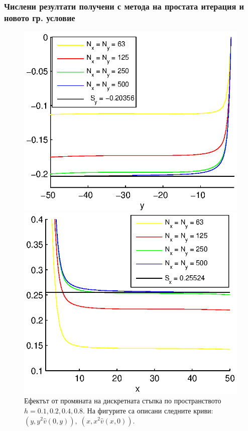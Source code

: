 \documentclass{beamer}
\begin{document}
\begin{frame}
\frametitle{Числени резултати получени с метода на простата итерация и новото гр. условие}
\begin{figure}[ht]
	\begin{minipage}[b]{0.45\linewidth}
		\raggedleft
		\includegraphics[width=\linewidth]{../Thesis/NewBoundaryCondition/crossSectionX=0FF.eps}
	\end{minipage}	
	\begin{minipage}[b]{0.45\linewidth}
		\raggedright
		 \includegraphics[width=\linewidth]{../Thesis/NewBoundaryCondition/crossSectionY=0FF.eps}
	\end{minipage}
	\caption{Ефектът от промяната на дискретната стъпка по пространството $h=0.1, 0.2, 0.4, 0.8$. На фигурите са описани следните криви: $(y, y^2 \widehat v(0,y)), \; (x, x^2 \widehat v(x,0))$. }
\end{figure}
\end{frame}
\end{document}
